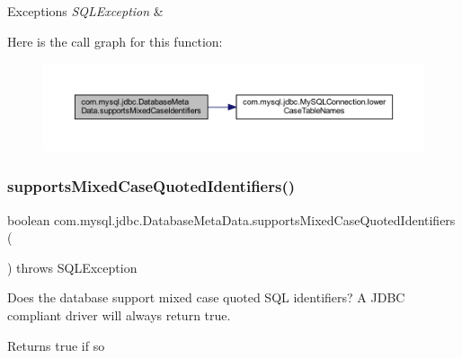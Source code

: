 \begin{DoxyExceptions}{Exceptions}
{\em S\+Q\+L\+Exception} & \\
\hline
\end{DoxyExceptions}
Here is the call graph for this function\+:
\nopagebreak
\begin{figure}[H]
\begin{center}
\leavevmode
\includegraphics[width=350pt]{classcom_1_1mysql_1_1jdbc_1_1_database_meta_data_ade3fcbd03cbcbc25ba3cccf0a5461350_cgraph}
\end{center}
\end{figure}
\mbox{\label{classcom_1_1mysql_1_1jdbc_1_1_database_meta_data_aa91a2f185bf73711f4632304d79240b9}} 
\subsubsection{\texorpdfstring{supports\+Mixed\+Case\+Quoted\+Identifiers()}{supportsMixedCaseQuotedIdentifiers()}}
{\footnotesize\ttfamily boolean com.\+mysql.\+jdbc.\+Database\+Meta\+Data.\+supports\+Mixed\+Case\+Quoted\+Identifiers (\begin{DoxyParamCaption}{ }\end{DoxyParamCaption}) throws S\+Q\+L\+Exception}

Does the database support mixed case quoted S\+QL identifiers? A J\+D\+BC compliant driver will always return true.

\begin{DoxyReturn}{Returns}
true if so 
\end{DoxyReturn}

